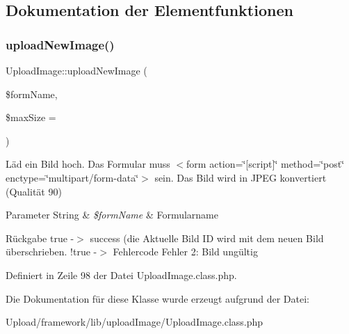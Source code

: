 \subsection{Dokumentation der Elementfunktionen}
\mbox{\label{class_upload_image_ae4f21ae36f850f3a2d2afe60337330aa}} 
\subsubsection{\texorpdfstring{upload\+New\+Image()}{uploadNewImage()}}
{\footnotesize\ttfamily Upload\+Image\+::upload\+New\+Image (\begin{DoxyParamCaption}\item[{}]{\$form\+Name,  }\item[{}]{\$max\+Size = {} }\end{DoxyParamCaption})}

Läd ein Bild hoch. Das Formular muss $<$form action=\char`\"{}\mbox{[}script\mbox{]}\char`\"{} method=\char`\"{}post\char`\"{} enctype=\char`\"{}multipart/form-\/data\char`\"{}$>$ sein. Das Bild wird in J\+P\+EG konvertiert (Qualität 90) 
\begin{DoxyParams}[1]{Parameter}
String & {\em \$form\+Name} & Formularname \\
\hline
\end{DoxyParams}
\begin{DoxyReturn}{Rückgabe}
true -\/$>$ success (die Aktuelle Bild ID wird mit dem neuen Bild überschrieben. !true -\/$>$ Fehlercode Fehler 2\+: Bild ungültig 
\end{DoxyReturn}


Definiert in Zeile 98 der Datei Upload\+Image.\+class.\+php.



Die Dokumentation für diese Klasse wurde erzeugt aufgrund der Datei\+:\begin{DoxyCompactItemize}
\item 
Upload/framework/lib/upload\+Image/Upload\+Image.\+class.\+php\end{DoxyCompactItemize}
